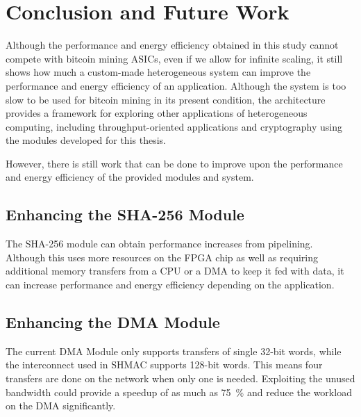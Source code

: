 \chapter{Conclusion and Future Work}
\label{cha:conclusion}

Although the performance and energy efficiency obtained in this study cannot compete
with bitcoin mining ASICs, even if we allow for infinite scaling, it still shows how much a custom-made
heterogeneous system can improve the performance and energy efficiency of an
application. Although the system is too slow to be used for bitcoin mining in its present
condition, the architecture provides a framework for exploring other applications of
heterogeneous computing, including throughput-oriented applications and cryptography
using the modules developed for this thesis.

However, there is still work that can be done to improve upon the performance and energy
efficiency of the provided modules and system.

\section{Enhancing the SHA-256 Module}

The SHA-256 module can obtain performance increases from pipelining. Although this uses more
resources on the FPGA chip as well as requiring additional memory transfers from a CPU or a
DMA to keep it fed with data, it can increase performance and energy efficiency depending
on the application.

\section{Enhancing the DMA Module}

The current DMA Module only supports transfers of single 32-bit words, while the interconnect used in SHMAC supports 128-bit words.
This means four transfers are done on the network when only one is needed. Exploiting the unused bandwidth could
provide a speedup of as much as 75~\% and reduce the workload on the DMA significantly.


